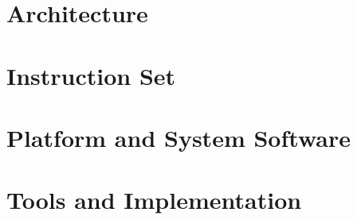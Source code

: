 \documentclass[10pt,a4paper,twoside,openright]{book}
\begin{document}
\frontmatter


\cleardoublepage
\tableofcontents
\cleardoublepage
\listoftables
\listoffigures

\mainmatter
\part{Architecture}\label{part:arch}









\part{Instruction Set}\label{part:isa}



\part{Platform and System Software}\label{part:platform}




\part{Tools and Implementation}\label{part:tools}





\appendix

\end{document}

